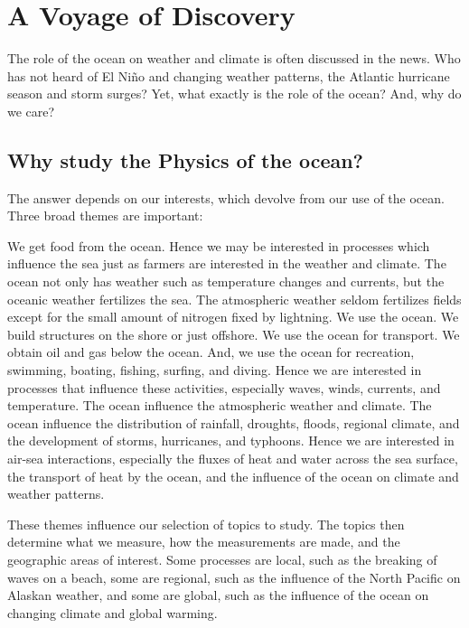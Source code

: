 \chapter{A Voyage of Discovery}

The role of the ocean on weather and climate is often
discussed in the news. Who has not heard of El Ni\~{n}o and changing
weather patterns, the Atlantic hurricane season and storm surges? Yet,
what exactly is the role of the ocean? And, why do we care?

\section[Physics of the ocean]{Why study the Physics of the ocean?}

The answer depends on our interests, which devolve from our use of the
ocean. Three broad themes are important:
\begin{enumerate}
\vitem We get food from the ocean. Hence we may be interested in
processes which influence the sea just as farmers are interested in
the weather and climate. The ocean not only has weather such as
temperature changes and currents, but the oceanic weather fertilizes
the sea. The atmospheric weather seldom fertilizes fields except for
the small amount of nitrogen fixed by lightning.
\vspace{-0.5ex}
\vitem We use the ocean. We build structures on the shore or just
offshore. We use the ocean for transport. We obtain oil and gas below
the ocean. And, we use the ocean for recreation, swimming, boating,
fishing, surfing, and diving. Hence we are interested in processes
that influence these activities, especially waves, winds, currents,
and temperature.
\vspace{-0.5ex}
\vitem The ocean influence the atmospheric weather and climate. The
ocean influence the distribution of rainfall, droughts, floods,
regional climate, and the development of storms, hurricanes, and
typhoons. Hence we are interested in air-sea interactions, especially
the fluxes of heat and water across the sea surface, the transport of
heat by the ocean, and the influence of the ocean on climate and
weather patterns.
\end{enumerate}
These themes influence our selection of topics to study. The topics
then determine what we measure, how the measurements are made, and the
geographic areas of interest. Some processes are local, such as the
breaking of waves on a beach, some are regional, such as the influence
of the North Pacific on Alaskan weather, and some are global, such as
the influence of the ocean on changing climate and global warming.

